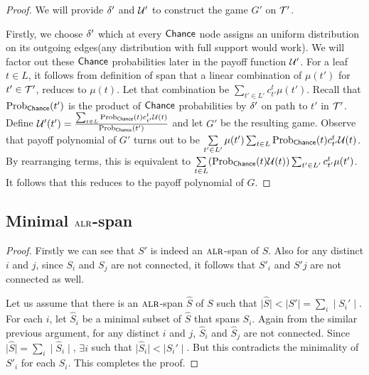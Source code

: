 \spanToGame*

\begin{proof}
We will provide $\delta'$ and $\mathcal{U}'$ to construct the game $G'$ on $\mathcal{T}'$. 

Firstly, we choose $\delta'$ which at every $\mathsf{Chance}$ node assigns an uniform distribution on its outgoing edges(any distribution with full support would work). We will factor out these $\mathsf{Chance}$ probabilities later in the payoff function $\mathcal{U}'$.   
For a leaf $t \in L$, it follows from definition of span that a linear combination of $\mu(t')$ for $t' \in \mathcal{T}'$, reduces to $\mu(t)$. Let that combination be $\sum_{t' \in L'}c^t_{t'}\mu(t')$. Recall that $\mathrm{Prob}_{\mathsf{Chance}}(t')$ is the product of $\mathsf{Chance}$ probabilities by $\delta'$ on path to $t'$ in $\mathcal{T}'$.  Define $\mathcal{U}'(t') = \frac{\sum_{t \in L}\mathrm{Prob}_{\mathsf{Chance}}(t)c^t_{t'}\mathcal{U}(t)}{\mathrm{Prob}_{\mathsf{Chance}}(t')} $ and let $G'$ be the resulting game. Observe that payoff polynomial of $G'$ turns out to be 
$\sum\limits_{t' \in L'}\mu(t')\sum_{t \in L}\mathrm{Prob}_{\mathsf{Chance}}(t)c^t_{t'}\mathcal{U}(t)$. By rearranging terms, this is equivalent to $\sum\limits_{t \in L} (\mathrm{Prob}_{\mathsf{Chance}}(t)\mathcal{U}(t))\sum_{t' \in L'}c^t_{t'}\mu(t')$. It follows that this reduces to the payoff polynomial of $G$.
\end{proof}

\subsection{Minimal $\textsc{alr}$-span }

\minSpanDisc*

\begin{proof}
Firstly we can see that $S'$ is indeed an $\textsc{alr}$-span of $S$. Also for any distinct $i$ and $j$, since $S_i$ and $S_j$ are not connected, it follows that $S'_i$ and $S'j$ are not connected as well. 

Let us assume that there is an $\textsc{alr}$-span $\hat{S}$ of $S$ such that $ \mid  \hat{S} \mid   <  \mid  S' \mid   = \sum\limits_i  \mid  S_i' \mid  $. For each $i$, let $\hat{S}_i$ be a minimal subset of $\hat{S}$ that spans $S_i$. Again from the similar previous argument, for any distinct $i$ and $j$, $\hat{S}_i$ and $\hat{S}_j$ are not connected. Since $ \mid  \hat{S} \mid  = \sum\limits_i  \mid  \hat{S}_i \mid  $, $\exists i$ such that $ \mid\hat{S}_i\mid   <  \mid S_i'\mid  $. But this  contradicts the minimality of $S'_i$ for each $S_i$. This completes the proof.  

\end{proof}

